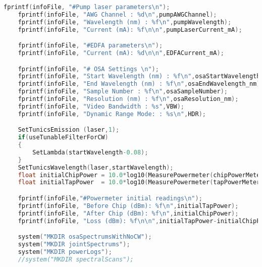 \begin{lstlisting}[style=customc, language=C]
    fprintf(infoFile, "#Pump laser parameters\n");
    fprintf(infoFile, "AWG Channel : %d\n",pumpAWGChannel);
    fprintf(infoFile, "Wavelength (nm) : %f\n",pumpWavelength);
    fprintf(infoFile, "Current (mA): %f\n\n",pumpLaserCurrent_mA);

    fprintf(infoFile, "#EDFA parameters\n");
    fprintf(infoFile, "Current (mA): %d\n\n",EDFACurrent_mA);

    fprintf(infoFile, "# OSA Settings \n");
    fprintf(infoFile, "Start Wavelength (nm) : %f\n",osaStartWavelength_nm);
    fprintf(infoFile, "End Wavelength (nm) : %f\n",osaEndWavelength_nm);
    fprintf(infoFile, "Sample Number : %f\n",osaSampleNumber);
    fprintf(infoFile, "Resolution (nm) : %f\n",osaResolution_nm);
    fprintf(infoFile, "Video Bandwidth : %s",VBW);
    fprintf(infoFile, "Dynamic Range Mode: : %s\n",HDR);

    SetTunicsEmission (laser,1);
    if(useTunableFilterForCW)
    {
        SetLambda(startWavelength-0.08);
    }
    SetTunicsWavelength(laser,startWavelength);
    float initialChipPower = 10.0*log10(MeasurePowermeter(chipPowerMeter)) + 30 + ChipPowermeterAttenuation;
    float initialTapPower  = 10.0*log10(MeasurePowermeter(tapPowerMeter))  + 30 + TapPowermeterAttenuation;

    fprintf(infoFile,"#Powermeter initial readings\n");
    fprintf(infoFile, "Before Chip (dBm): %f\n",initialTapPower);
    fprintf(infoFile, "After Chip (dBm): %f\n",initialChipPower);
    fprintf(infoFile, "Loss (dBm): %f\n\n",initialTapPower-initialChipPower);

    system("MKDIR osaSpectrumsWithNoCW");
    system("MKDIR jointSpectrums");
    system("MKDIR powerLogs");
    //system("MKDIR spectralScans");


\end{lstlisting}

